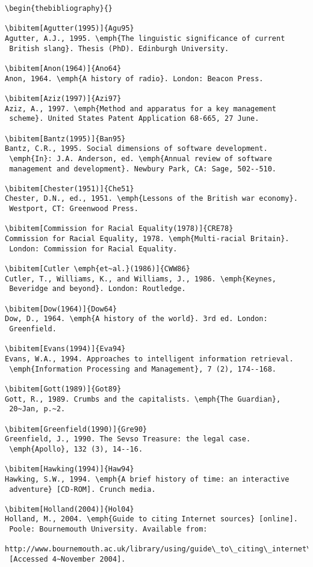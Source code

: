 \documentclass[]{interact}
\theoremstyle{plain}%
\theoremstyle{definition}
\theoremstyle{remark}
\begin{document}
\begin{verbatim}
\begin{thebibliography}{}

\bibitem[Agutter(1995)]{Agu95}
Agutter, A.J., 1995. \emph{The linguistic significance of current
 British slang}. Thesis (PhD). Edinburgh University.

\bibitem[Anon(1964)]{Ano64}
Anon, 1964. \emph{A history of radio}. London: Beacon Press.

\bibitem[Aziz(1997)]{Azi97}
Aziz, A., 1997. \emph{Method and apparatus for a key management
 scheme}. United States Patent Application 68-665, 27 June.

\bibitem[Bantz(1995)]{Ban95}
Bantz, C.R., 1995. Social dimensions of software development.
 \emph{In}: J.A. Anderson, ed. \emph{Annual review of software
 management and development}. Newbury Park, CA: Sage, 502--510.

\bibitem[Chester(1951)]{Che51}
Chester, D.N., ed., 1951. \emph{Lessons of the British war economy}.
 Westport, CT: Greenwood Press.

\bibitem[Commission for Racial Equality(1978)]{CRE78}
Commission for Racial Equality, 1978. \emph{Multi-racial Britain}.
 London: Commission for Racial Equality.

\bibitem[Cutler \emph{et~al.}(1986)]{CWW86}
Cutler, T., Williams, K., and Williams, J., 1986. \emph{Keynes,
 Beveridge and beyond}. London: Routledge.

\bibitem[Dow(1964)]{Dow64}
Dow, D., 1964. \emph{A history of the world}. 3rd ed. London:
 Greenfield.

\bibitem[Evans(1994)]{Eva94}
Evans, W.A., 1994. Approaches to intelligent information retrieval.
 \emph{Information Processing and Management}, 7 (2), 174--168.

\bibitem[Gott(1989)]{Got89}
Gott, R., 1989. Crumbs and the capitalists. \emph{The Guardian},
 20~Jan, p.~2.

\bibitem[Greenfield(1990)]{Gre90}
Greenfield, J., 1990. The Sevso Treasure: the legal case.
 \emph{Apollo}, 132 (3), 14--16.

\bibitem[Hawking(1994)]{Haw94}
Hawking, S.W., 1994. \emph{A brief history of time: an interactive
 adventure} [CD-ROM]. Crunch media.

\bibitem[Holland(2004)]{Hol04}
Holland, M., 2004. \emph{Guide to citing Internet sources} [online].
 Poole: Bournemouth University. Available from:
 http://www.bournemouth.ac.uk/library/using/guide\_to\_citing\_internet\_sourc.html
 [Accessed 4~November 2004].


\end{verbatim}
\end{document}
